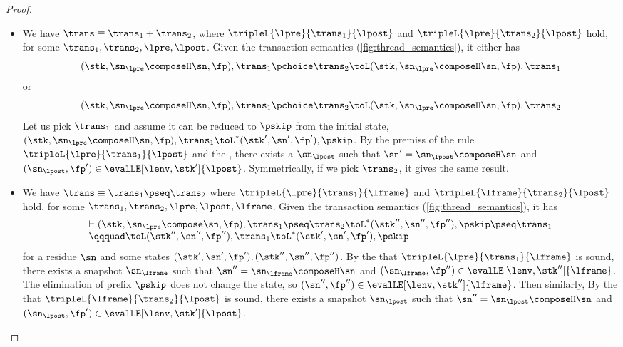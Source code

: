 \begin{proof}
\begin{itemize}
\item {}
We have  \(\trans \equiv \trans_{1} + \trans_{2} \), where \( \tripleL{\lpre}{\trans_{1}}{\lpost} \) and \( \tripleL{\lpre}{\trans_{2}}{\lpost} \) hold, for some \( \trans_{1}, \trans_{2}, \lpre, \lpost \).
Given the transaction semantics (\cref{fig:thread_semantics}), it either has 
\[ 
( \stk, \sn_\lpre \composeH \sn, \fp ), \trans_{1} \pchoice \trans_{2} \toL ( \stk, \sn_\lpre \composeH \sn, \fp ), \trans_{1} 
\]
or  
\[ 
( \stk, \sn_\lpre \composeH \sn, \fp ), \trans_{1} \pchoice \trans_{2} \toL ( \stk, \sn_\lpre \composeH \sn, \fp ), \trans_{2} 
\]
Let us pick \( \trans_{1} \) and  assume it can be reduced to \( \pskip \) from the initial state, \ie \( ( \stk, \sn_\lpre \composeH \sn, \fp ), \trans_{1}  \toL^{*} ( \stk', \sn', \fp' ), \pskip \).
By the premiss of the rule \( \tripleL{\lpre}{\trans_{1}}{\lpost} \) and the \ih, 
there exists a \( \sn_\lpost \) such that \( \sn' = \sn_\lpost \composeH \sn \) and  \( (\sn_\lpost, \fp') \in \evalLE[\lenv, \stk']{\lpost} \).
Symmetrically, if we pick \( \trans_{2} \), it gives the same result.

\item {}
We have \( \trans \equiv \trans_{1} \pseq \trans_{2} \) where \( \tripleL{\lpre}{\trans_{1}}{\lframe} \) and \( \tripleL{\lframe}{\trans_{2}}{\lpost} \) hold, for some \( \trans_{1}, \trans_{2}, \lpre, \lpost, \lframe \).
Given the transaction semantics (\cref{fig:thread_semantics}), 
it has 
\[
    \begin{array}{l}
    \vdash ( \stk, \sn_\lpre \compose \sn, \fp ), \trans_{1} \pseq \trans_{2} \toL^{*} ( \stk'', \sn'', \fp'' ), \pskip \pseq \trans_{1} \\
    \qqquad \toL ( \stk'', \sn'', \fp'' ), \trans_{1} \toL^{*} ( \stk', \sn', \fp' ), \pskip 
\end{array}
\] 
for a residue \( \sn \) and  some states \( (\stk', \sn', \fp'), (\stk'', \sn'', \fp'') \).
By the \ih that \( \tripleL{\lpre}{\trans_{1}}{\lframe} \) is sound,
there exists a snapshot \( \sn_\lframe \) such that \( \sn'' = \sn_\lframe \composeH \sn \) and \( (\sn_\lframe, \fp'') \in \evalLE[\lenv, \stk'']{\lframe} \).
The elimination of prefix \( \pskip \) does not change the state, so \( (\sn'', \fp'') \in \evalLE[\lenv, \stk'']{\lframe} \).
Then similarly, 
By the \ih that \( \tripleL{\lframe}{\trans_{2}}{\lpost} \) is sound,
there exists a snapshot \( \sn_\lpost \) such that \( \sn'' = \sn_\lpost \composeH \sn \) and \( (\sn_\lpost, \fp') \in \evalLE[\lenv, \stk']{\lpost} \).


\end{itemize}
\end{proof}

